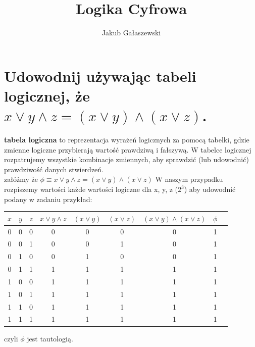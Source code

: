 \documentclass{article}
\title{Logika Cyfrowa}
\author{Jakub Gałaszewski}
\begin{document}
\maketitle
\section{ Udowodnij używając \textbf{tabeli logicznej}, że $x \vee y \wedge z = (x \vee y) \wedge (x \vee z)$.}
 \textbf{tabela logiczna} to reprezentacja wyrażeń logicznych za pomocą tabelki, gdzie zmienne logiczne przybierają wartość prawdziwą i fałszywą. W tabelce logicznej rozpatrujemy wszystkie kombinacje zmiennych, aby sprawdzić (lub udowodnić) prawdziwość danych stwierdzeń.\\
załóżmy  że $\phi \equiv x \vee y \wedge z = (x \vee y) \wedge (x \vee z)$
W naszym przypadku rozpiszemy wartości każde wartości logiczne dla x, y, z ($2^3$) aby udowodnić podany w zadaniu przykład:\\
\begin{center}
	\begin{tabular}{|c|c|c|c|c|c|c|c|c|} 
	 \hline
	 $x$ & $y$ & $z$ & $x \vee y \wedge z$ & $(x \vee y)$ & $(x \vee z)$ & $(x \vee y) \wedge (x \vee z)$& $\phi$\\ 
	 \hline \hline
	 0 & 0 & 0 & 0 & 0 & 0 & 0 & 1\\ 
	 \hline
	 0 & 0 & 1 & 0 & 0 & 1 & 0 & 1\\ 
	 \hline
	 0 & 1 & 0 & 0 & 1 & 0 & 0 & 1\\ 
	 \hline
	 0 & 1 & 1 & 1 & 1 & 1 & 1 & 1\\ 
	 \hline
	 1 & 0 & 0 & 1 & 1 & 1 & 1 & 1\\ 
	 \hline
	 1 & 0 & 1 & 1 & 1 & 1 & 1 & 1\\ 
	 \hline
	 1 & 1 & 0 & 1 & 1 & 1 & 1 & 1\\ 
	 \hline
	 1 & 1 & 1 & 1 & 1 & 1 & 1 & 1\\ 
	 \hline
	 
	\end{tabular}
\end{center}
czyli $\phi$ jest tautologią.
\end{document}
